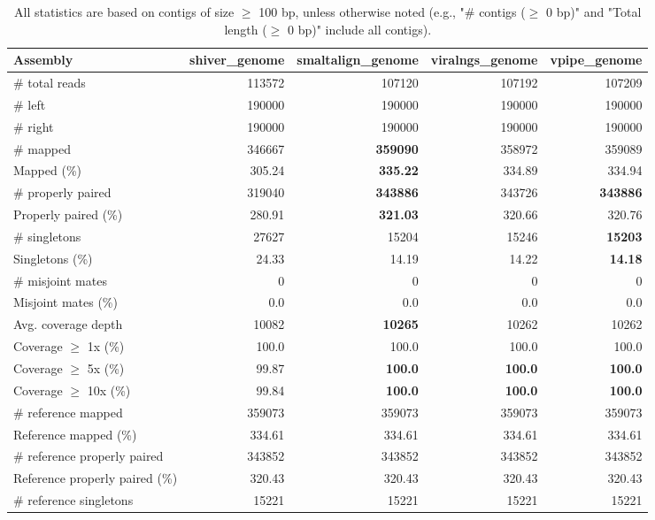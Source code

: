 \documentclass[12pt,a4paper]{article}
\begin{document}
\begin{table}[ht]
\begin{center}
\caption{All statistics are based on contigs of size $\geq$ 100 bp, unless otherwise noted (e.g., "\# contigs ($\geq$ 0 bp)" and "Total length ($\geq$ 0 bp)" include all contigs).}
\begin{tabular}{|l*{4}{|r}|}
\hline
Assembly & shiver\_genome & smaltalign\_genome & viralngs\_genome & vpipe\_genome \\ \hline
\# total reads & 113572 & 107120 & 107192 & 107209 \\ \hline
\# left & 190000 & 190000 & 190000 & 190000 \\ \hline
\# right & 190000 & 190000 & 190000 & 190000 \\ \hline
\# mapped & 346667 & {\bf 359090} & 358972 & 359089 \\ \hline
Mapped (\%) & 305.24 & {\bf 335.22} & 334.89 & 334.94 \\ \hline
\# properly paired & 319040 & {\bf 343886} & 343726 & {\bf 343886} \\ \hline
Properly paired (\%) & 280.91 & {\bf 321.03} & 320.66 & 320.76 \\ \hline
\# singletons & 27627 & 15204 & 15246 & {\bf 15203} \\ \hline
Singletons (\%) & 24.33 & 14.19 & 14.22 & {\bf 14.18} \\ \hline
\# misjoint mates & 0 & 0 & 0 & 0 \\ \hline
Misjoint mates (\%) & 0.0 & 0.0 & 0.0 & 0.0 \\ \hline
Avg. coverage depth & 10082 & {\bf 10265} & 10262 & 10262 \\ \hline
Coverage $\geq$ 1x (\%) & 100.0 & 100.0 & 100.0 & 100.0 \\ \hline
Coverage $\geq$ 5x (\%) & 99.87 & {\bf 100.0} & {\bf 100.0} & {\bf 100.0} \\ \hline
Coverage $\geq$ 10x (\%) & 99.84 & {\bf 100.0} & {\bf 100.0} & {\bf 100.0} \\ \hline
\# reference mapped & 359073 & 359073 & 359073 & 359073 \\ \hline
Reference mapped (\%) & 334.61 & 334.61 & 334.61 & 334.61 \\ \hline
\# reference properly paired & 343852 & 343852 & 343852 & 343852 \\ \hline
Reference properly paired (\%) & 320.43 & 320.43 & 320.43 & 320.43 \\ \hline
\# reference singletons & 15221 & 15221 & 15221 & 15221 \\ \hline

\end{tabular}
\end{center}
\end{table}
\end{document}
